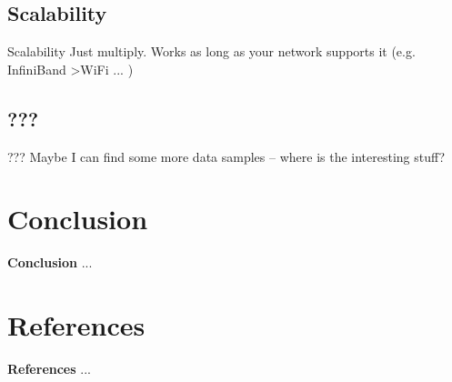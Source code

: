 \documentclass[compress,t,xcolor=dvipsnames]{beamer}
\begin{document}
\subsection{Scalability}
\begin{frame}{Scalability}
    Just multiply. Works as long as your network supports it (e.g. InfiniBand \textgreater WiFi ... )
\end{frame}

\subsection{???}
\begin{frame}{???}
    Maybe I can find some more data samples -- where is the interesting stuff?
\end{frame}


\section{Conclusion}

\begin{frame}{\textbf{Conclusion}}
    ...
\end{frame}


\section{References}

\begin{frame}{\textbf{References}}
    ...
\end{frame}

\end{document}
